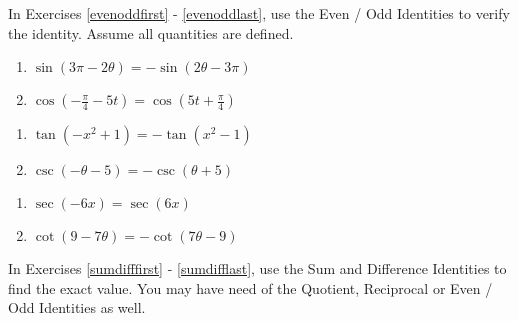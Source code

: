 In Exercises \ref{evenoddfirst} - \ref{evenoddlast}, use the Even / Odd Identities to verify the identity.  Assume all quantities are defined.

\begin{multicols}{2}

\begin{enumerate}

\item $\sin(3\pi - 2\theta) = -\sin(2\theta - 3\pi)$  \label{evenoddfirst}
\item $\cos \left( -\frac{\pi}{4} - 5t \right) = \cos \left( 5t + \frac{\pi}{4} \right)$

\setcounter{HW}{\value{enumi}}

\end{enumerate}

\end{multicols}

\begin{multicols}{2}

\begin{enumerate}

\setcounter{enumi}{\value{HW}}

\item $\tan(-x^{2} + 1) = -\tan(x^{2} - 1)$
\item $\csc(-\theta - 5) = -\csc(\theta + 5)$

\setcounter{HW}{\value{enumi}}

\end{enumerate}

\end{multicols}

\begin{multicols}{2}

\begin{enumerate}

\setcounter{enumi}{\value{HW}}

\item $\sec(-6x) = \sec(6x)$
\item $\cot(9 - 7\theta) = -\cot(7\theta - 9)$ \label{evenoddlast}

\setcounter{HW}{\value{enumi}}

\end{enumerate}

\end{multicols}

In Exercises \ref{sumdifffirst} - \ref{sumdifflast}, use the Sum and Difference Identities to find the exact value.  You may have need of the Quotient, Reciprocal or Even / Odd Identities as well.

